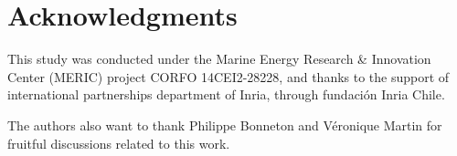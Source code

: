 \section*{Acknowledgments}

\indent This study was conducted under the Marine Energy Research \& Innovation Center (MERIC) project CORFO 14CEI2-28228, and thanks to the support of international partnerships department of Inria, through fundación Inria Chile.

\indent The authors also want to thank Philippe Bonneton and Véronique Martin for fruitful discussions related to this work.